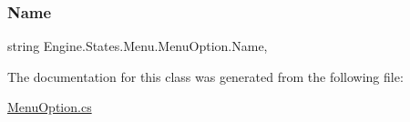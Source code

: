 \subsubsection{\texorpdfstring{Name}{Name}}
{\footnotesize\ttfamily string Engine.\+States.\+Menu.\+Menu\+Option.\+Name\hspace{0.3cm}{\ttfamily [get]}, {\ttfamily [set]}}



The documentation for this class was generated from the following file\+:\begin{DoxyCompactItemize}
\item 
\hyperlink{a00218}{Menu\+Option.\+cs}\end{DoxyCompactItemize}
